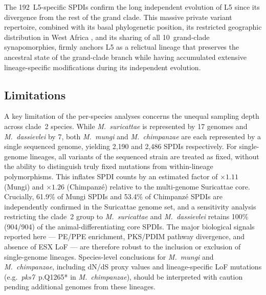 \documentclass[11pt,a4paper]{article}
\newcommand{\Msur}{\textit{M.~suricattae}}
\newcommand{\Mmun}{\textit{M.~mungi}}
\newcommand{\Mdas}{\textit{M.~dassievlei}}
\newcommand{\Mchi}{\textit{M.~chimpanzae}}
\begin{document}
The 192~L5-specific SPDIs confirm the long independent evolution of L5
since its divergence from the rest of the grand clade.
%
This massive private variant repertoire, combined with its basal
phylogenetic position, its restricted geographic distribution in West
Africa \cite{Gehre2013}, and its sharing of all 10~grand-clade
synapomorphies, firmly anchors L5 as a relictual lineage that preserves
the ancestral state of the grand-clade branch while having accumulated
extensive lineage-specific modifications during its independent evolution.

\subsection{Limitations}
\label{sec:disc:limits}

A key limitation of the per-species analyses concerns the unequal sampling depth
across clade~2 species.
%
While \Msur{} is represented by 17 genomes and \Mdas{} by 7, both \Mmun{} and
\Mchi{} are each represented by a single sequenced genome, yielding 2{,}190 and
2{,}486 SPDIs respectively.
%
For single-genome lineages, all variants of the sequenced strain are treated as
fixed, without the ability to distinguish truly fixed mutations from within-lineage
polymorphisms.
%
This inflates SPDI counts by an estimated factor of $\times1.11$ (Mungi) and
$\times1.26$ (Chimpanzé) relative to the multi-genome Suricattae core.
%
Crucially, 61.9\% of Mungi SPDIs and 53.4\% of Chimpanzé SPDIs are independently
confirmed in the Suricattae genome set, and a sensitivity analysis restricting the
clade~2 group to \Msur{} and \Mdas{} retains 100\% (904/904) of the animal-differentiating
core SPDIs.
%
The major biological signals reported here --- PE/PPE enrichment, PKS/PDIM pathway
divergence, and absence of ESX LoF --- are therefore robust to the inclusion or
exclusion of single-genome lineages.
%
Species-level conclusions for \Mmun{} and \Mchi{}, including dN/dS proxy values and
lineage-specific LoF mutations (e.g.\ \textit{pks7}~p.Q1265* in \Mchi{}),
should be interpreted with caution pending additional genomes from these lineages.
\end{document}
